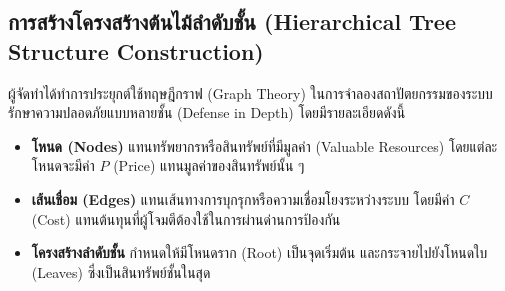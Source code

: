 \subsection{การสร้างโครงสร้างต้นไม้ลําดับชั้น (Hierarchical Tree Structure Construction)}
ผู้จัดทำได้ทำการประยุกต์ใช้ทฤษฎีกราฟ (Graph Theory) ในการจำลองสถาปัตยกรรมของระบบรักษาความปลอดภัยแบบหลายชั้น (Defense in Depth)  โดยมีรายละเอียดดังนี้
\begin{itemize}
\item \textbf{โหนด (Nodes)} แทนทรัพยากรหรือสินทรัพย์ที่มีมูลค่า (Valuable Resources) โดยแต่ละโหนดจะมีค่า $P$ (Price) แทนมูลค่าของสินทรัพย์นั้น ๆ 
\item \textbf{เส้นเชื่อม (Edges)} แทนเส้นทางการบุกรุกหรือความเชื่อมโยงระหว่างระบบ โดยมีค่า $C$ (Cost) แทนต้นทุนที่ผู้โจมตีต้องใช้ในการผ่านด่านการป้องกัน 
\item \textbf{โครงสร้างลําดับชั้น} กำหนดให้มีโหนดราก (Root) เป็นจุดเริ่มต้น และกระจายไปยังโหนดใบ (Leaves) ซึ่งเป็นสินทรัพย์ชั้นในสุด 
\end{itemize}


